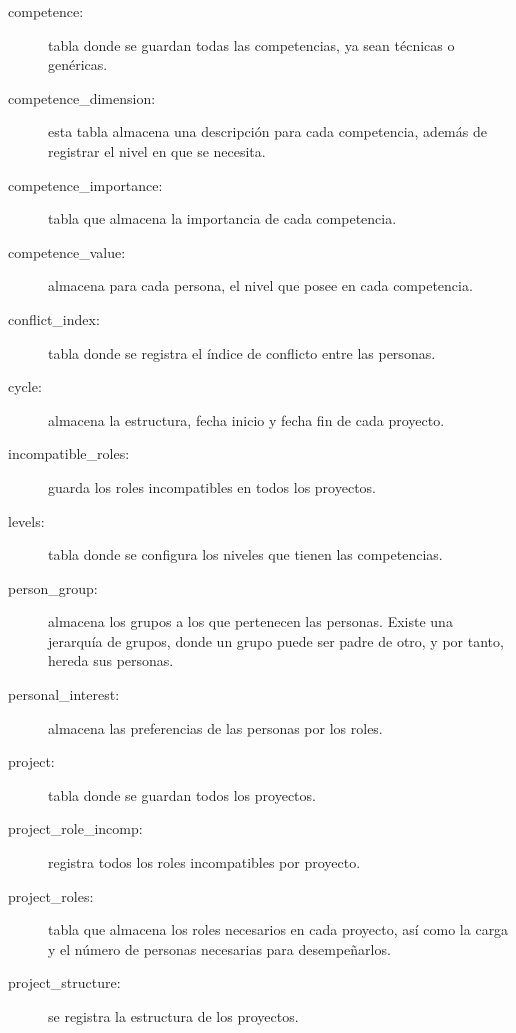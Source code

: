 \begin{description}
	\item[competence:] tabla donde se guardan todas las competencias, ya sean técnicas o genéricas. 
	
	\item[competence\_dimension:] esta tabla almacena una descripción para cada competencia, además de registrar el nivel en que se necesita.
	
	\item[competence\_importance:] tabla que almacena la importancia de cada competencia.
	
	\item[competence\_value:] almacena para cada persona, el nivel que posee en cada competencia.
	
	\item[conflict\_index:] tabla donde se registra el índice de conflicto entre las personas.
	
	\item[cycle:] almacena la estructura, fecha inicio y fecha fin de cada proyecto.
	
	\item[incompatible\_roles:]  guarda los roles incompatibles en todos los proyectos.
	
	\item[levels:] tabla donde se configura los niveles que tienen las competencias. 
	
	\item[person\_group:] almacena los grupos a los que pertenecen las personas. Existe una jerarquía de grupos, donde un grupo puede ser padre de otro, y por tanto, hereda sus personas.
	
	\item[personal\_interest:] almacena las preferencias de las personas por los roles.
	
	\item[project:] tabla donde se guardan todos los proyectos.
	
	\item[project\_role\_incomp:] registra todos los roles incompatibles por proyecto.
	
	\item[project\_roles:] tabla que almacena los roles necesarios en cada proyecto, así como la carga y el número de personas necesarias para desempeñarlos. 
	
	\item[project\_structure:] se registra la estructura de los proyectos.
	

\end{description}
